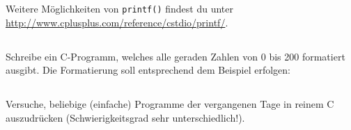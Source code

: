 Weitere Möglichkeiten von \lstinline{printf()} findest du unter \url{http://www.cplusplus.com/reference/cstdio/printf/}.

\subsection{}
Schreibe ein C-Programm, welches alle geraden Zahlen von 0 bis 200 formatiert ausgibt.
Die Formatierung soll entsprechend dem Beispiel erfolgen:



\subsection{}
Versuche, beliebige (einfache) Programme der vergangenen Tage in reinem C auszudrücken (Schwierigkeitsgrad sehr unterschiedlich!).
